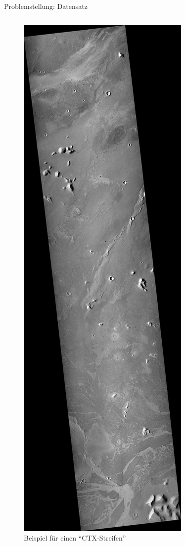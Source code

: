 \documentclass[9pt]{beamer}
\begin{document}
\begin{frame}{Problemstellung: Datensatz}
\begin{columns}
\begin{column}{.3\textwidth}
\begin{figure}[H]
			\includegraphics[height=.6\textheight, keepaspectratio]{P03-2.jpg}
			\caption{Beispiel für einen \enquote{CTX-Streifen}\footnotemark[1]}
		\end{figure}
	\end{column}
\end{columns}	
\end{frame}
\end{document}
